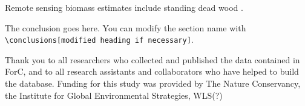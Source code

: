 \documentclass[, manuscript]{copernicus}
\begin{document}
Remote sensing biomass estimates include standing dead wood
\citep{duncanson_aboveground_2021}.

\conclusions[Conclusions]

The conclusion goes here. You can modify the section name with
\texttt{\textbackslash{}conclusions{[}modified\ heading\ if\ necessary{]}}.











\begin{acknowledgements}
Thank you to all researchers who collected and published the data
contained in ForC, and to all research assistants and collaborators who
have helped to build the database. Funding for this study was provided
by The Nature Conservancy, the Institute for Global Environmental
Strategies, WLS(?)
\end{acknowledgements}







\end{document}
